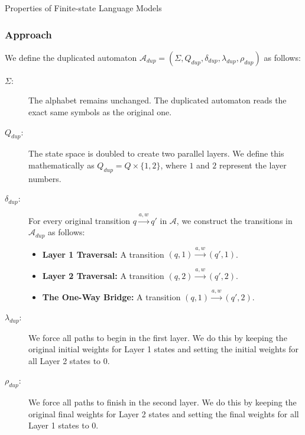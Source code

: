 \begin{question}{Properties of Finite-state Language Models}

\begin{subquestion}

\subsubsection*{Approach}

We define the duplicated automaton $\mathcal{A}_{dup} = (\Sigma, Q_{dup}, \delta_{dup}, \lambda_{dup}, \rho_{dup})$ as follows:

\begin{description}

    \item[$\Sigma$:]
    The alphabet remains unchanged. The duplicated automaton reads the exact same symbols as the original one.

    \item[$Q_{dup}$:]
    The state space is doubled to create two parallel layers. We define this mathematically as $Q_{dup} = Q \times \{1, 2\}$, where $1$ and $2$ represent the layer numbers.

    \item[$\delta_{dup}$:]
    For every original transition $q \xrightarrow{a, w} q'$ in $\mathcal{A}$, we construct the transitions in $\mathcal{A}_{dup}$ as follows:

    \begin{itemize}
        \item \textbf{Layer 1 Traversal:} A transition $(q, 1) \xrightarrow{a, w} (q', 1)$.
        \item \textbf{Layer 2 Traversal:} A transition $(q, 2) \xrightarrow{a, w} (q', 2)$.
        \item \textbf{The One-Way Bridge:} A transition $(q, 1) \xrightarrow{a, w} (q', 2)$.
    \end{itemize}

    \item[$\lambda_{dup}$:]
    We force all paths to begin in the first layer. We do this by keeping the original initial weights for Layer 1 states and setting the initial weights for all Layer 2 states to $0$.

    \item[$\rho_{dup}$:]
    We force all paths to finish in the second layer. We do this by keeping the original final weights for Layer 2 states and setting the final weights for all Layer 1 states to $0$.


\end{description}
\end{subquestion}
\end{question}
